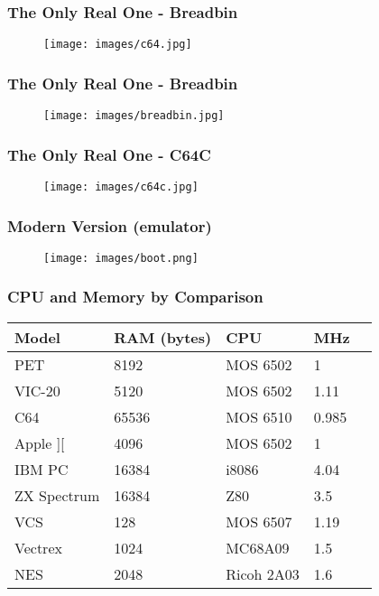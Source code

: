 \documentclass[aspectratio=43]{uva-inf-presentation}
\begin{document}
\begin{frame}
\frametitle{The Only Real One - Breadbin}

\begin{figure}
\texttt{[image: images/c64.jpg]}
\end{figure}

\end{frame}


\begin{frame}
\frametitle{The Only Real One - Breadbin}

\begin{figure}
\texttt{[image: images/breadbin.jpg]}
\end{figure}

\end{frame}


\begin{frame}
\frametitle{The Only Real One - C64C}

\begin{figure}
\texttt{[image: images/c64c.jpg]}
\end{figure}

\end{frame}


\begin{frame}
\frametitle{Modern Version (emulator)}

\begin{figure}
\texttt{[image: images/boot.png]}
\end{figure}

\end{frame}


\begin{frame}
\frametitle{CPU and Memory by Comparison}

\begin{tabular}{|l|l|l|l|l|}
\hline Model & RAM (bytes) & CPU & MHz \\ \hline
PET & 8192 & MOS 6502 & 1 \\
VIC-20 & 5120 & MOS 6502 & 1.11 \\
C64 & 65536 & MOS 6510 & 0.985 \\ \hline
Apple ][ & 4096 & MOS 6502 & 1 \\
IBM PC & 16384 & i8086 & 4.04 \\
ZX Spectrum & 16384 & Z80 & 3.5 \\ \hline
VCS & 128 & MOS 6507 & 1.19 \\
Vectrex & 1024 & MC68A09 & 1.5 \\
NES & 2048 & Ricoh 2A03 & 1.6 \\ \hline
\end{tabular}

\end{frame}
\end{document}
